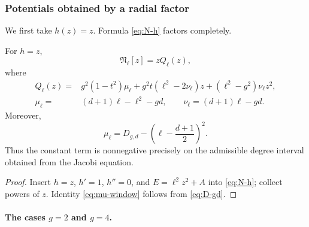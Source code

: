 \subsubsection{Potentials obtained by a radial factor}

We first take \(h(z)=z\).  Formula \eqref{eq:N-h} factors completely.

\begin{proposition}
\label{prop:radial-Q}
For \(h=z\),
\begin{equation}\label{eq:N-z-Q}
 \mathfrak N_\ell[z]=zQ_\ell(z),
\end{equation}
where
\begin{align}
 Q_\ell(z)={}&g^2(1-t^2)\mu_\ell
 +g^2t(\ell^2-2\nu_\ell)z
 +(\ell^2-g^2)\nu_\ell z^2,              \label{eq:Q-ell}\\
 \mu_\ell={}&(d+1)\ell-\ell^2-gd,\qquad
 \nu_\ell=(d+1)\ell-gd.                  \label{eq:mu-nu}
\end{align}
Moreover,
\begin{equation}\label{eq:mu-window}
 \mu_\ell=D_{g,d}-\left(\ell-\frac{d+1}{2}\right)^2.
\end{equation}
Thus the constant term is nonnegative precisely on the admissible
degree interval obtained from the Jacobi equation.
\end{proposition}

\begin{proof}
Insert \(h=z\), \(h'=1\), \(h''=0\), and
\(E=\ell^2z^2+A\) into \eqref{eq:N-h}; collect powers of \(z\).
Identity \eqref{eq:mu-window} follows from \eqref{eq:D-gd}.
\end{proof}

\paragraph{The cases \texorpdfstring{\(g=2\) and \(g=4\)}{g=2 and g=4}.}

